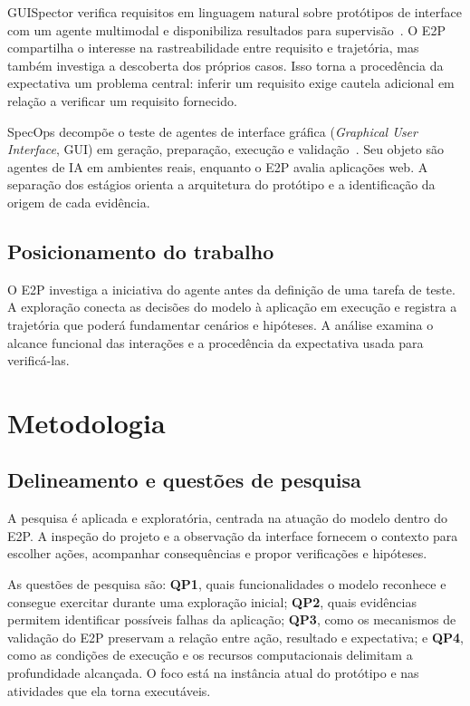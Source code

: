 \documentclass[12pt]{article}
\begin{document}
GUISpector verifica requisitos em linguagem natural sobre protótipos de interface com um agente multimodal e disponibiliza resultados para supervisão~\cite{kolthoff2025guispector}. O E2P compartilha o interesse na rastreabilidade entre requisito e trajetória, mas também investiga a descoberta dos próprios casos. Isso torna a procedência da expectativa um problema central: inferir um requisito exige cautela adicional em relação a verificar um requisito fornecido.

SpecOps decompõe o teste de agentes de interface gráfica (\textit{Graphical User Interface}, GUI) em geração, preparação, execução e validação~\cite{ahmed2026specops}. Seu objeto são agentes de IA em ambientes reais, enquanto o E2P avalia aplicações web. A separação dos estágios orienta a arquitetura do protótipo e a identificação da origem de cada evidência.

\subsection{Posicionamento do trabalho}
O E2P investiga a iniciativa do agente antes da definição de uma tarefa de teste. A exploração conecta as decisões do modelo à aplicação em execução e registra a trajetória que poderá fundamentar cenários e hipóteses. A análise examina o alcance funcional das interações e a procedência da expectativa usada para verificá-las.

\section{Metodologia}\label{sec:method}
\subsection{Delineamento e questões de pesquisa}
A pesquisa é aplicada e exploratória, centrada na atuação do modelo dentro do E2P. A inspeção do projeto e a observação da interface fornecem o contexto para escolher ações, acompanhar consequências e propor verificações e hipóteses.

As questões de pesquisa são: \textbf{QP1}, quais funcionalidades o modelo reconhece e consegue exercitar durante uma exploração inicial; \textbf{QP2}, quais evidências permitem identificar possíveis falhas da aplicação; \textbf{QP3}, como os mecanismos de validação do E2P preservam a relação entre ação, resultado e expectativa; e \textbf{QP4}, como as condições de execução e os recursos computacionais delimitam a profundidade alcançada. O foco está na instância atual do protótipo e nas atividades que ela torna executáveis.
\end{document}
